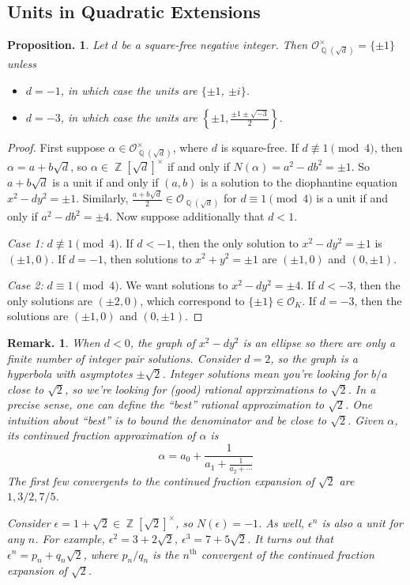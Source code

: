 \documentclass[11pt, a4paper]{memoir}
\DeclareMathOperator{\Q}{{\mathbb{Q}}}
\DeclareMathOperator{\Z}{{\mathbb{Z}}}
\theoremstyle{change}
\newtheorem{proposition}[theorem]{Proposition.}
\theoremstyle{plain}
\theoremstyle{nonumberplain}
\newtheorem{remark}{Remark.}
\newtheorem{proof}{Proof}
\numberwithin{equation}{section}
\begin{document}
\subsection{Units in Quadratic Extensions}
\begin{proposition}
    Let $d$ be a square-free negative integer.
    Then $\mathcal{O}_{\Q(\sqrt{d})}^\times=\{\pm 1\}$ unless
    \begin{itemize}[nolistsep]
        \item $d=-1$, in which case the units are $\{\pm 1$, $\pm i\}$.
        \item $d=-3$, in which case the units are $\left\{\pm 1,\frac{\pm 1\pm\sqrt{-3}}{2}\right\}$.
    \end{itemize}
\end{proposition}
\begin{proof}
    First suppose $\alpha\in\mathcal{O}_{\Q(\sqrt{d})}^\times$, where $d$ is square-free.
    If $d\nequiv 1\pmod{4}$, then $\alpha=a+b\sqrt{d}$, so $\alpha\in\Z[\sqrt{d}]^\times$ if and only if $N(\alpha)=a^2-db^2=\pm 1$.
    So $a+b\sqrt{d}$ is a unit if and only if $(a,b)$ is a solution to the diophantine equation $x^2-dy^2=\pm1$.
    Similarly, $\frac{a+b\sqrt{d}}{2}\in\mathcal{O}_{\Q(\sqrt{d})}$ for $d\equiv 1\pmod{4}$ is a unit if and only if $a^2-db^2=\pm 4$.
    Now suppose additionally that $d<1$.

    \textit{Case 1:} $d\nequiv 1\pmod{4}$.
    If $d<-1$, then the only solution to $x^2-dy^2=\pm 1$ is $(\pm 1,0)$.
    If $d=-1$, then solutions to $x^2+y^2=\pm 1$ are $(\pm 1,0)$ and $(0,\pm 1)$.

    \textit{Case 2:} $d\equiv 1\pmod{4}$.
    We want solutions to $x^2-dy^2=\pm 4$.
    If $d<-3$, then the only solutions are $(\pm 2,0)$, which correspond to $\{\pm 1\}\in\mathcal{O}_K$.
    If $d=-3$, then the solutions are $(\pm 1,0)$ and $(0,\pm 1)$.
\end{proof}
\begin{remark}
    When $d<0$, the graph of $x^2-dy^2$ is an ellipse so there are only a finite number of integer pair solutions.
    Consider $d=2$, so the graph is a hyperbola with asymptotes $\pm\sqrt{2}$.
    Integer solutions mean you're looking for $b/a$ close to $\sqrt{2}$, so we're looking for (good) rational apprximations to $\sqrt{2}$.
    In a precise sense, one can define the ``best'' rational approximation to $\sqrt{2}$.
    One intuition about ``best'' is to bound the denominator and be close to $\sqrt{2}$.
    Given $\alpha$, its continued fraction approximation of $\alpha$ is
    \begin{equation*}
        \alpha=a_0+\frac{1}{a_1+\frac{1}{a_2+\cdots}}
    \end{equation*}
    The first few convergents to the continued fraction expansion of $\sqrt{2}$ are $1,3/2,7/5$.

    Consider $\epsilon=1+\sqrt{2}\in\Z[\sqrt{2}]^\times$, so $N(\epsilon)=-1$.
    As well, $\epsilon^n$ is also a unit for any $n$.
    For example, $\epsilon^2=3+2\sqrt{2}$, $\epsilon^3=7+5\sqrt{2}$.
    It turns out that $\epsilon^n=p_n+q_n\sqrt{2}$, where $p_n/q_n$ is the $n^\text{th}$ convergent of the continued fraction expansion of $\sqrt{2}$.
\end{remark}
\end{document}
